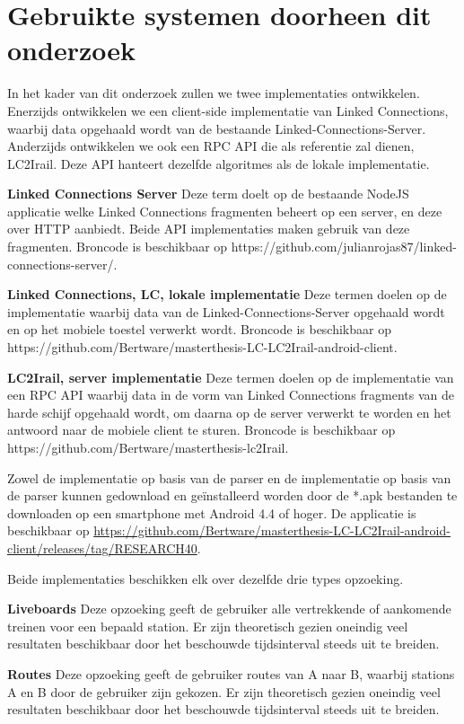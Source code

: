 \section{Gebruikte systemen doorheen dit onderzoek}
In het kader van dit onderzoek zullen we twee implementaties ontwikkelen. Enerzijds ontwikkelen we een client-side implementatie van Linked Connections, waarbij data opgehaald wordt van de bestaande Linked-Connections-Server. Anderzijds ontwikkelen we ook een RPC API die als referentie zal dienen, LC2Irail. Deze API hanteert dezelfde algoritmes als de lokale implementatie.

\textbf{Linked Connections Server} Deze term doelt op de bestaande NodeJS applicatie welke Linked Connections fragmenten beheert op een server, en deze over HTTP aanbiedt. Beide API implementaties maken gebruik van deze fragmenten. Broncode is beschikbaar op https://github.com/julianrojas87/linked-connections-server/.

\textbf{Linked Connections, LC, lokale implementatie} Deze termen doelen op de implementatie waarbij data van de Linked-Connections-Server opgehaald wordt en op het mobiele toestel verwerkt wordt. Broncode is beschikbaar op https://github.com/Bertware/masterthesis-LC-LC2Irail-android-client.

\textbf{LC2Irail, server implementatie} Deze termen doelen op de implementatie van een RPC API waarbij data in de vorm van Linked Connections fragments van de harde schijf opgehaald wordt, om daarna op de server verwerkt te worden en het antwoord naar de mobiele client te sturen. Broncode is beschikbaar op https://github.com/Bertware/masterthesis-lc2Irail.

Zowel de implementatie op basis van de  parser en de implementatie op basis van de  parser kunnen gedownload en geïnstalleerd worden door de *.apk bestanden te downloaden op een smartphone met Android 4.4 of hoger. De applicatie is beschikbaar op \url{https://github.com/Bertware/masterthesis-LC-LC2Irail-android-client/releases/tag/RESEARCH40}.

Beide implementaties beschikken elk over dezelfde drie types opzoeking.

\textbf{Liveboards} Deze opzoeking geeft de gebruiker alle vertrekkende of aankomende treinen voor een bepaald station. Er zijn theoretisch gezien oneindig veel resultaten beschikbaar door het beschouwde tijdsinterval steeds uit te breiden.

\textbf{Routes} Deze opzoeking geeft de gebruiker routes van A naar B, waarbij stations A en B door de gebruiker zijn gekozen. Er zijn theoretisch gezien oneindig veel resultaten beschikbaar door het beschouwde tijdsinterval steeds uit te breiden.


